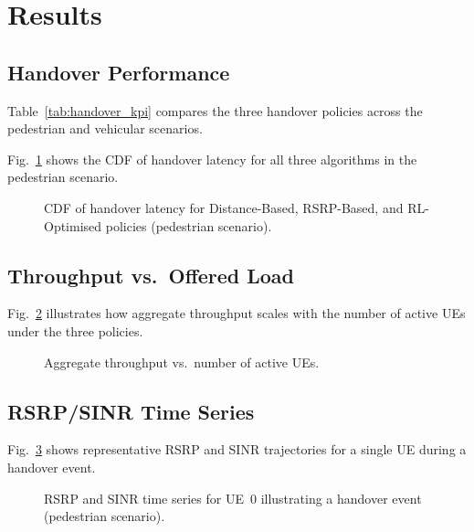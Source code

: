 \section{Results}
\label{sec:results}



\subsection{Handover Performance}
Table~\ref{tab:handover_kpi} compares the three handover policies across
the pedestrian and vehicular scenarios.



Fig.~\ref{fig:latency_cdf} shows the CDF of handover latency for all three
algorithms in the pedestrian scenario.

\begin{figure}[htbp]
  \centering
  
  \caption{CDF of handover latency for Distance-Based, RSRP-Based, and
           RL-Optimised policies (pedestrian scenario).}
  \label{fig:latency_cdf}
\end{figure}

\subsection{Throughput vs.\ Offered Load}
Fig.~\ref{fig:throughput_load} illustrates how aggregate throughput
scales with the number of active UEs under the three policies.

\begin{figure}[htbp]
  \centering
  
  \caption{Aggregate throughput vs.\ number of active UEs.}
  \label{fig:throughput_load}
\end{figure}

\subsection{RSRP/SINR Time Series}
Fig.~\ref{fig:rsrp_timeseries} shows representative RSRP and SINR
trajectories for a single UE during a handover event.

\begin{figure}[htbp]
  \centering
  
  \caption{RSRP and SINR time series for UE~0 illustrating a handover
           event (pedestrian scenario).}
  \label{fig:rsrp_timeseries}
\end{figure}

